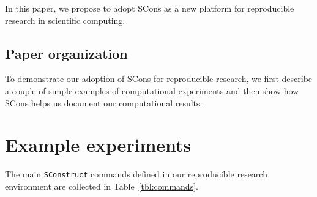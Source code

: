 In this paper, we propose to adopt SCons as a new platform for
reproducible research in scientific computing.

\subsection{Paper organization}

To demonstrate our adoption of SCons for reproducible research, we
first describe a couple of simple examples of computational
experiments and then show how SCons helps us document our
computational results.

\begin{comment}
\newpage
\section{Madagascar open source code}
%
Madagascar's homepage is \url{http://rsf.sourceforge.net}. Madagascar
source code is proposed in two versions:
\href{https://sourceforge.net/project/showfiles.php?group_id=162909}{stable}
and
\href{http://rsf.sourceforge.net/wiki/index.php/Svn-url}{development}.
The stable version is a snapshot of Madagascar at a given time. It was
installed on different platforms and tested before being released.
Updates are typically done every few months as opposed to the
development version which is updated every few hours or days by a
dynamic team of developers. As such, there is no guarantee that the
development version will be fully functional and stable at any given
point in time. In the remaining of this paper, we assume that you have
successfully installed Madagascar stable version and that you have an
Internet connection\footnote{XXX provide alternate mean to download
  Lena.img if no Internet connection XXX}.
\end{comment}

\section{Example experiments}

%
The main \texttt{SConstruct} commands defined in our reproducible
research environment are collected in Table~\ref{tbl:commands}.


